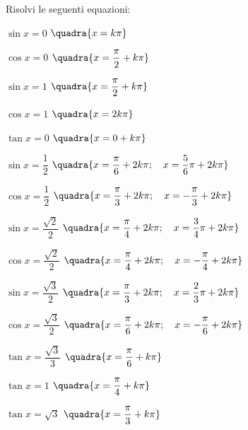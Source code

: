 \begin{esercizio}\label{ese:03.1}
Risolvi le seguenti equazioni:
 \begin{enumeratea}
  \item $\sin x = 0$
   \hfill $\quadra{x = k \pi}$
  \item $\cos x = 0$
   \hfill $\quadra{x = \dfrac{\pi}{2} + k \pi}$
  \item $\sin x = 1$
   \hfill $\quadra{x = \dfrac{\pi}{2} + k \pi}$
  \item $\cos x = 1$
   \hfill $\quadra{x = 2 k \pi}$
  \item $\tan x = 0$
   \hfill $\quadra{x = 0 + k \pi}$
  \item $\sin x = \dfrac{1}{2}$
   \hfill $\quadra{x = \dfrac{\pi}{6} + 2k \pi; \quad
                   x = \dfrac{5}{6}\pi + 2k \pi}$
  \item $\cos x = \dfrac{1}{2}$
   \hfill $\quadra{x = \dfrac{\pi}{3} + 2k \pi; \quad
                   x = -\dfrac{\pi}{3} + 2k \pi}$
  \item $\sin x = \dfrac{\sqrt{2}}{2}$
   \hfill $\quadra{x = \dfrac{\pi}{4} + 2k \pi; \quad
                   x = \dfrac{3}{4}\pi + 2k \pi}$
  \item $\cos x = \dfrac{\sqrt{2}}{2}$
   \hfill $\quadra{x = \dfrac{\pi}{4} + 2k \pi; \quad
                   x = -\dfrac{\pi}{4} + 2k \pi}$
  \item $\sin x = \dfrac{\sqrt{3}}{2}$
   \hfill $\quadra{x = \dfrac{\pi}{3} + 2k \pi; \quad
                   x = \dfrac{2}{3}\pi + 2k \pi}$
  \item $\cos x = \dfrac{\sqrt{3}}{2}$
   \hfill $\quadra{x = \dfrac{\pi}{6} + 2k \pi; \quad
                   x = -\dfrac{\pi}{6} + 2k \pi}$
  \item $\tan x = \dfrac{\sqrt{3}}{3}$
   \hfill $\quadra{x = \dfrac{\pi}{6} + k \pi}$
  \item $\tan x = 1$
   \hfill $\quadra{x = \dfrac{\pi}{4} + k \pi}$
  \item $\tan x = \sqrt{3}$
   \hfill $\quadra{x = \dfrac{\pi}{3} + k \pi}$
 \end{enumeratea}
\end{esercizio}

